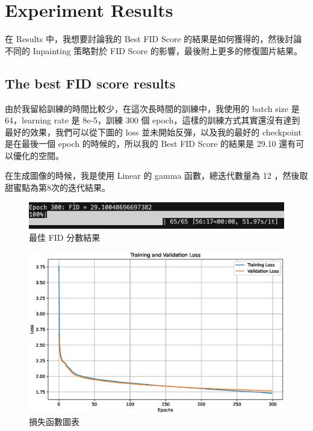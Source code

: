 \clearpage
\section{Experiment Results}
在 Results 中，我想要討論我的 Best FID Score 的結果是如何獲得的，然後討論不同的 Inpainting 策略對於 FID Score 的影響，最後附上更多的修復圖片結果。


\subsection{The best FID score results}
由於我留給訓練的時間比較少，在這次長時間的訓練中，我使用的 batch size 是 64，learning rate 是 8e-5，訓練 300 個 epoch，這樣的訓練方式其實還沒有達到最好的效果，我們可以從下圖的 loss 並未開始反彈，以及我的最好的 checkpoint 是在最後一個 epoch 的時候的，所以我的 Best FID Score 的結果是 29.10 還有可以優化的空間。

在生成圖像的時候，我是使用 Linear 的 gamma 函數，總迭代數量為 12 ，然後取甜蜜點為第8次的迭代結果。

\begin{figure}[h]
    \centering
    \includegraphics[width=\textwidth]{figures/best_fid_score.png}
    \caption{最佳 FID 分數結果}
    \label{fig:best_fid_score}
\end{figure}


\begin{figure}[h]
    \centering
    \includegraphics[width=\textwidth]{figures/loss_plot.eps}
    \caption{損失函數圖表}
    \label{fig:loss_plot}
\end{figure}


